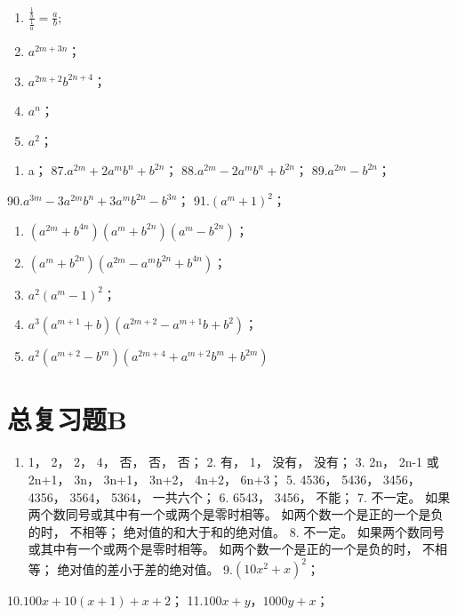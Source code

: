 \begin{enumerate}[start=81]
\item
  \(\frac{\frac{1}{b}}{\frac{1}{a}} = \frac{a}{b};\)
\item
  \(a^{2m + 3n}\)；
\item
  \(a^{2m + 2}b^{2n + 4}\)；
\item
  \(a^n\)；
\item
  \(a^2\)；
\end{enumerate}

\begin{enumerate}[start=86]
\item
  a； 87.\(a^{2m} + 2a^{m}b^{n} + b^{2n}\)；
  88.\(a^{2m} - 2a^{m}b^{n} + b^{2n}\)； 89.\(a^{2m} - b^{2n}\)；
\end{enumerate}

90.\(a^{3m} - 3a^{2m}b^n + 3a^m b^{2n} - b^{3n}\)； 91.\((a^m + 1)^2\)；

\begin{enumerate}[start=92]
\item
  \((a^{2m} + b^{4n})(a^m + b^{2n})(a^m - b^{2n})\)；
\item
  \((a^m + b^{2n})(a^{2m} - a^m b^{2n} + b^{4n})\)；
\item
  \(a^2 (a^m - 1)^2\)；
\item
  \(a^3 (a^{m + 1} + b)(a^{2m + 2} - a^{m + 1}b + b^2)\)；
\item
  \(a^2 (a^{m + 2} - b^m)(a^{2m + 4} + a^{m + 2}b^{m} + b^{2m})\)
\end{enumerate}

\section{总复习题B}

\begin{enumerate}
\item
  1， 2， 2， 4， 否， 否， 否； 2. 有， 1， 没有， 没有； 3. 2n， 2n-1
  或 2n+1， 3n， 3n+1， 3n+2， 4n+2， 6n+3； 5. 4536， 5436， 3456，
  4356， 3564， 5364， 一共六个； 6. 6543， 3456， 不能； 7. 不一定。
  如果两个数同号或其中有一个或两个是零时相等。
  如两个数一个是正的一个是负的时， 不相等； 绝对值的和大于和的绝对值。
  8. 不一定。 如果两个数同号或其中有一个或两个是零时相等。
  如两个数一个是正的一个是负的时， 不相等； 绝对值的差小于差的绝对值。
  9.\((10x^{2} + x)^{2}\)；
\end{enumerate}

10.\(100x + 10(x + 1) + x + 2\)； 11.\(100x + y\)，\(1000y + x\)；

